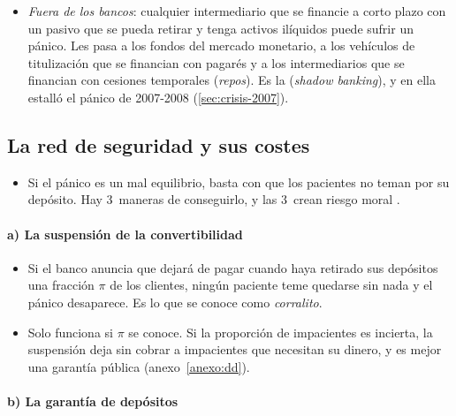 \documentclass[11pt]{article}
\begin{document}
\begin{itemize}
\item \emph{Fuera de los bancos}: cualquier intermediario que se financie a corto plazo con un pasivo que se pueda retirar y tenga activos ilíquidos puede sufrir un pánico. Les pasa a los fondos del mercado monetario, a los vehículos de titulización que se financian con pagarés y a los intermediarios que se financian con cesiones temporales (\emph{repos}). Es la  (\emph{shadow banking}), y en ella estalló el pánico de 2007-2008 (\ref{sec:crisis-2007}).
\end{itemize}

\subsection{La red de seguridad y sus costes}\label{sec:red-seguridad}

\begin{itemize}
\item Si el pánico es un mal equilibrio, basta con que los pacientes no teman por su depósito. Hay 3~maneras de conseguirlo, y las 3~crean riesgo moral .
\end{itemize}

\paragraph{a) La suspensión de la convertibilidad}

\begin{itemize}
\item Si el banco anuncia que dejará de pagar cuando haya retirado sus depósitos una fracción $\pi$ de los clientes, ningún paciente teme quedarse sin nada y el pánico desaparece\nocite{DiamondDybvig1983Bank}. Es lo que se conoce como \emph{corralito}.
\item Solo funciona si $\pi$ se conoce. Si la proporción de impacientes es incierta, la suspensión deja sin cobrar a impacientes que necesitan su dinero, y es mejor una garantía pública (anexo~\ref{anexo:dd}).
\end{itemize}

\paragraph{b) La garantía de depósitos}
\end{document}
